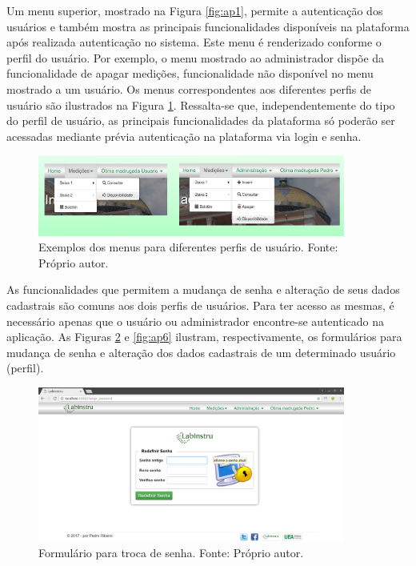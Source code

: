 Um menu superior, mostrado na Figura \ref{fig:ap1}, permite a autenticação dos usuários e também mostra as principais funcionalidades disponíveis na plataforma após realizada autenticação no sistema. Este menu é renderizado conforme o perfil do usuário. Por exemplo, o menu mostrado ao administrador dispõe da funcionalidade de apagar medições, funcionalidade não disponível no menu mostrado a um usuário. Os menus correspondentes aos diferentes perfis de usuário são ilustrados na Figura \ref{fig:ap8}. Ressalta-se que, independentemente do tipo do perfil de usuário, as principais funcionalidades da plataforma só poderão ser acessadas mediante prévia autenticação na plataforma via login e senha.


\begin{figure}[h!]
	\centering
	\includegraphics[width=0.9\textwidth]{./img/ap8.png}
	\caption{Exemplos dos menus para diferentes perfis de usuário. Fonte: Próprio autor.} \label{fig:ap8}
\end{figure}

As funcionalidades que permitem a mudança de senha e alteração de seus dados cadastrais são comuns aos dois perfis de usuários. Para ter acesso as mesmas, é necessário apenas que o usuário ou administrador encontre-se autenticado na aplicação. As Figuras \ref{fig:ap5} e \ref{fig:ap6} ilustram, respectivamente, os formulários para mudança de senha e alteração dos dados cadastrais de um determinado usuário (perfil).

\begin{figure}[h!]
	\centering
	\includegraphics[width=0.9\textwidth]{./img/ap5.png}
	\caption{Formulário para troca de senha. Fonte: Próprio autor.} \label{fig:ap5}
\end{figure}

